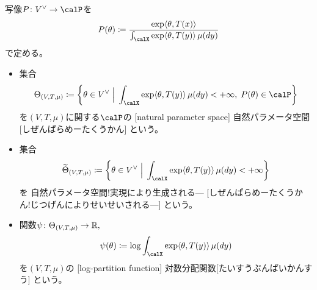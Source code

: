 \documentclass[report]{jlreq}
\begin{document}
\begin{definition}[自然パラメータ空間]
    写像$P \colon V^\vee \to \calP$を
    \begin{equation}
        P(\theta)
            \coloneqq
                \frac{
                    \exp \langle \theta, T(x) \rangle
                }{
                    \int_\calX \exp \langle \theta, T(y) \rangle \, \mu(dy)
                }
    \end{equation}
    で定める。
    \begin{itemize}
        \item 集合
            \begin{equation}
                \Theta_{(V, T, \mu)}
                    \coloneqq \mybrace{
                        \theta \in V^\vee
                        \;\Big|\;
                        \int_\calX
                            \exp \langle \theta, T(y) \rangle \, \mu(dy)
                            < +\infty, \;
                        P(\theta) \in \calP
                    }
            \end{equation}
            を$(V, T, \mu)$に関する$\calP$の
            [natural parameter space]
                {自然パラメータ空間}[しぜんぱらめーたくうかん]
            という。
        \item 集合
            \begin{equation}
                \wt{\Theta}_{(V, T, \mu)}
                    \coloneqq
                        \mybrace{
                            \theta \in V^\vee
                            \;\Big|\;
                            \int_\calX
                                \exp \langle \theta, T(y) \rangle \, \mu(dy)
                                < +\infty
                        }
            \end{equation}
            を
                {自然パラメータ空間!実現により生成される---}
                [しぜんぱらめーたくうかん!じつげんによりせいせいされる---]
            という。
        \item 関数$\psi \colon \Theta_{(V, T, \mu)} \to \mathbb{R},$
            \begin{equation}
                \psi(\theta)
                    \coloneqq
                    \log \int_\calX \exp \langle \theta, T(y) \rangle \, \mu(dy)
            \end{equation}
            を$(V, T, \mu)$の
            [log-partition function]
                {対数分配関数}[たいすうぶんぱいかんすう]
            という。
    \end{itemize}
\end{definition}
\end{document}
